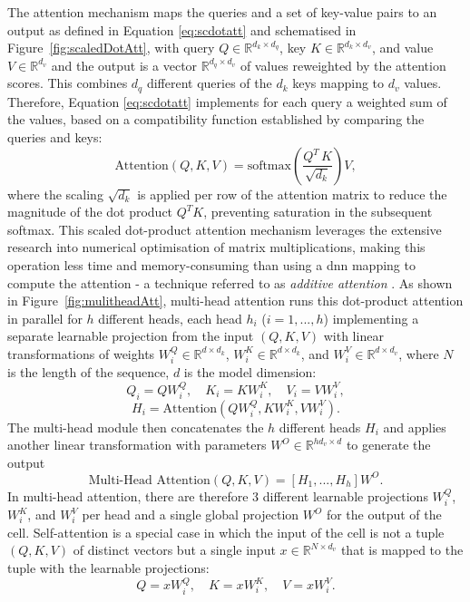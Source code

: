 The attention mechanism maps the queries and a set of key-value pairs to an output as defined in Equation \ref{eq:scdotatt} and schematised in Figure~\ref{fig:scaledDotAtt}, with query $Q \in \mathbb{R}^{d_k \times d_q}$, key $K \in \mathbb{R}^{d_k \times d_v}$, and value $V \in \mathbb{R}^{d_v}$ and the output is a vector $\mathbb{R}^{d_q \times d_v}$ of values reweighted by the attention scores. This combines $d_q$ different queries of the $d_k$ keys mapping to $d_v$ values. Therefore, Equation \ref{eq:scdotatt} implements for each query a weighted sum of the values, based on a compatibility function established by comparing the queries and keys:
\begin{equation}\label{eq:scdotatt}
    \text{Attention}(Q, K, V) = \text{softmax}\left( \frac{Q^T \, K}{\sqrt{d_k}}\right) V,
\end{equation} 
where the scaling $\sqrt{d_k}$ is applied per row of the attention matrix to reduce the magnitude of the dot product $Q^T K$, preventing saturation in the subsequent softmax. This scaled dot-product attention mechanism leverages the extensive research into numerical optimisation of matrix multiplications, making this operation less time and memory-consuming than using a \gls{dnn} mapping to compute the attention - a technique referred to as \textit{additive attention} \cite{Bahdanau2014NeuralMT}. As shown in Figure~\ref{fig:mulitheadAtt}, multi-head attention runs this dot-product attention in parallel for $h$ different heads, each head $h_i$ ($i = 1, ..., h$) implementing a separate learnable projection from the input $(Q, K, V)$ with linear transformations of weights $W_i^Q \in \mathbb{R}^{d \times d_k}$, $W_i^K \in \mathbb{R}^{d \times d_k}$, and $W_i^V \in \mathbb{R}^{d \times d_v}$, where $N$ is the length of the sequence, $d$ is the model dimension: \[Q_i = Q W_i^Q, \quad K_i = K W_i^K, \quad V_i = V W_i^V,\] \[H_i = \text{Attention}(QW_i^Q, KW_i^K, VW_i^V).\] The multi-head module then concatenates the $h$ different heads $H_i$ and applies another linear transformation with parameters $W^O \in \mathbb{R}^{hd_v \times d}$ to generate the output \[\text{Multi-Head Attention}(Q, K, V) = \left[H_1, ..., H_h\right]W^O .\] In multi-head attention, there are therefore 3 different learnable projections $W_i^Q$, $W_i^K$, and $W_i^V$ per head and a single global projection $W^O$ for the output of the cell. Self-attention is a special case in which the input of the cell is not a tuple $(Q, K, V)$ of distinct vectors but a single input $x \in \mathbb{R}^{N \times d_v}$ that is mapped to the tuple with the learnable projections: \[Q = xW_i^Q, \quad K = xW_i^K, \quad V = xW_i^V.\]

